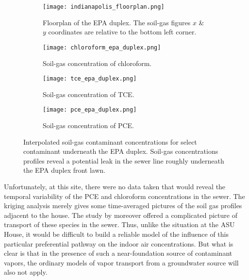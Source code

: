 \begin{figure}[htb!]
  \centering
  \begin{subfigure}{0.45\textwidth}
    \centering
    \texttt{[image: indianapolis\_floorplan.png]}
    \caption{Floorplan of the EPA duplex. The soil-gas figures $x$ \& $y$ coordinates are relative to the bottom left corner.}
  \end{subfigure}
  \begin{subfigure}{0.49\textwidth}
    \texttt{[image: chloroform\_epa\_duplex.png]}
    \caption{Soil-gas concentration of chloroform.}
  \end{subfigure}
  \begin{subfigure}{0.45\textwidth}
    \texttt{[image: tce\_epa\_duplex.png]}
    \caption{Soil-gas concentration of TCE.}
  \end{subfigure}
  \begin{subfigure}{0.45\textwidth}
    \texttt{[image: pce\_epa\_duplex.png]}
    \caption{Soil-gas concentration of PCE.}
  \end{subfigure}
  \caption[Interpolated soil-gas contaminant concentrations for select contaminant underneath the EPA duplex.]{Interpolated soil-gas contaminant concentrations for select contaminant underneath the EPA duplex. Soil-gas concentrations profiles reveal a potential leak in the sewer line roughly underneath the EPA duplex front lawn.}
  \label{fig:kriging_results}
\end{figure}

Unfortunately, at this site, there were no data taken that would reveal the temporal variability of the PCE and chloroform concentrations in the sewer.
The kriging analysis merely gives some time-averaged pictures of the soil gas profiles adjacent to the house.
The study by \citeauthor{mchugh_evidence_2017}\cite{mchugh_evidence_2017} moreover offered a complicated picture of transport of these species in the sewer.
Thus, unlike the situation at the ASU House, it would be difficult to build a reliable model of the influence of this particular preferential pathway on the indoor air concentrations.
But what is clear is that in the presence of such a near-foundation source of contaminant vapors, the ordinary models of vapor transport from a groundwater source will also not apply.\par
